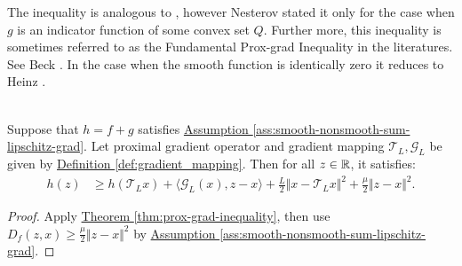 \documentclass[12pt]{article}
\begin{document}
    \begin{remark}
        The inequality is analogous to \cite[(2.2.57)]{nesterov_lectures_2018}, however Nesterov stated it only for the case when $g$ is an indicator function of some convex set $Q$. 
        Further more, this inequality is sometimes referred to as the Fundamental Prox-grad Inequality in the literatures. 
        See Beck \cite[Theorem 10.16]{beck_first-order_2017}. 
        In the case when the smooth function is identically zero it reduces to Heinz \cite[Proposition 12.26]{bauschke_convex_2017}. 
    \end{remark}

    \begin{lemma}
    \label{lemma:grad_map_linearization}\; \\
        Suppose that $h = f + g$ satisfies 
        \hyperref[ass:smooth-nonsmooth-sum-lipschitz-grad]
        {Assumption \ref*{ass:smooth-nonsmooth-sum-lipschitz-grad}}. 
        Let proximal gradient operator and gradient mapping $\mathcal T_L, \mathcal G_L$ be given by
        \hyperref[def:gradient_mapping]{Definition \ref*{def:gradient_mapping}}. 
        Then for all $z \in \mathbb R$, it satisfies: 
        \begin{align*}
            h(z) &\ge 
            h(\mathcal T_L x) + \langle \mathcal G_L (x), z - x\rangle + 
            \frac{L}{2}\Vert x - \mathcal T_L x\Vert^2 + \frac{\mu}{2}
            \Vert z - x\Vert^2. 
        \end{align*}
    \end{lemma}
    \begin{proof}
        Apply 
        \hyperref[thm:prox-grad-inequality]{Theorem \ref*{thm:prox-grad-inequality}}, 
        then use $D_f(z, x) \ge \frac{\mu}{2}\Vert z - x\Vert^2$ by 
        \hyperref[ass:smooth-nonsmooth-sum-lipschitz-grad]
        {Assumption \ref*{ass:smooth-nonsmooth-sum-lipschitz-grad}}. 
    \end{proof}
   
\end{document}
